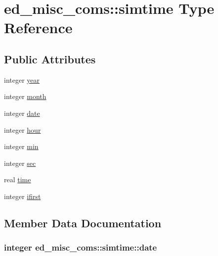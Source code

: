 \hypertarget{structed__misc__coms_1_1simtime}{}\section{ed\+\_\+misc\+\_\+coms\+:\+:simtime Type Reference}
\label{structed__misc__coms_1_1simtime}
\subsection*{Public Attributes}
\begin{DoxyCompactItemize}
\item 
integer \hyperlink{structed__misc__coms_1_1simtime_aa33c38e2a4be886fb46a0b41fc3614a9}{year}
\item 
integer \hyperlink{structed__misc__coms_1_1simtime_ab86b304a048841744f882f3d246b16b4}{month}
\item 
integer \hyperlink{structed__misc__coms_1_1simtime_a59815290d08ac367aeba85374f9fd29e}{date}
\item 
integer \hyperlink{structed__misc__coms_1_1simtime_a29ae7a915202b4505663d98424170644}{hour}
\item 
integer \hyperlink{structed__misc__coms_1_1simtime_aa6712664d87da86087d97814e6e6ac18}{min}
\item 
integer \hyperlink{structed__misc__coms_1_1simtime_ae8e8980c611067383ea98b345220a9ad}{sec}
\item 
real \hyperlink{structed__misc__coms_1_1simtime_af1edf430fdbca01a520e8d813d6f769a}{time}
\item 
integer \hyperlink{structed__misc__coms_1_1simtime_a41401a549e7e7e0b641ca1ee0e1e4664}{ifirst}
\end{DoxyCompactItemize}


\subsection{Member Data Documentation}
\subsubsection[{\texorpdfstring{date}{date}}]{\setlength{\rightskip}{0pt plus 5cm}integer ed\+\_\+misc\+\_\+coms\+::simtime\+::date}\hypertarget{structed__misc__coms_1_1simtime_a59815290d08ac367aeba85374f9fd29e}{}\label{structed__misc__coms_1_1simtime_a59815290d08ac367aeba85374f9fd29e}
